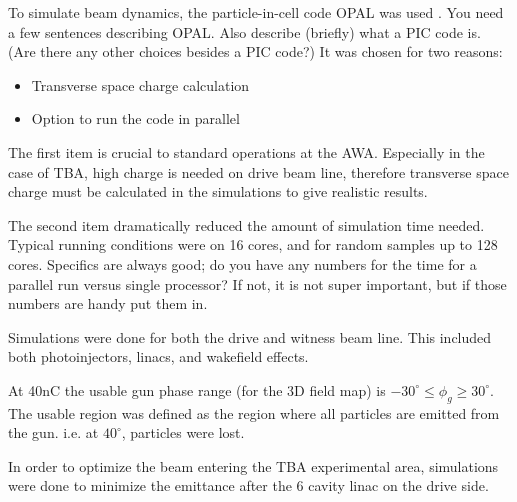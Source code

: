 \documentclass{iitthesis}
\newcommand{\lsnote}[1]{\textsf{{\color{violet}{ LS note:}   #1 }}}
\begin{document}
To simulate beam dynamics, the particle-in-cell code OPAL was used \cite{opal}. \lsnote{You need a few sentences describing OPAL.  Also describe (briefly) what a PIC code is.  (Are there any other choices besides a PIC code?)}
It was chosen for two reasons:
\begin{itemize}
	\item Transverse space charge calculation 
	\item Option to run the code in parallel
\end{itemize} 

The first item is crucial to standard operations at the AWA. Especially in the 
case of TBA, high charge is needed on drive beam line, therefore transverse 
space charge must be calculated in the simulations to give realistic results.

The second item dramatically reduced the amount of simulation time needed. 
Typical running conditions were on 16 cores, and for random samples up to 128 cores.  \lsnote{Specifics are always good; do you have any numbers for the time for a parallel run versus single processor?  If not, it is not super important, but if those numbers are handy put them in.}

 \label{sec:opt}
 \label{sec:simulations}
Simulations were done for both the drive and witness beam line. 
This included both photoinjectors, linacs, and wakefield effects. 


At 40nC the usable gun phase range (for the 3D field map) is 
$-30^\circ \le \phi_g \ge 30^\circ$. The usable region was defined 
as the region where all particles are emitted from the gun. 
i.e. at $40^\circ$, particles were lost.  

 \label{sec:pareto}

In order to optimize the beam entering the TBA experimental area, 
simulations were done to minimize the emittance after the 6 cavity linac
on the drive side. 
\end{document}
